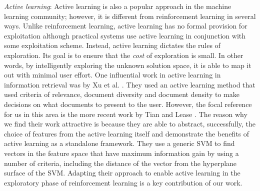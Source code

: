 \documentclass{acm_proc_article-sp}
\begin{document}
\emph{Active learning}: Active learning is also a popular approach in the machine learning community; however, it is different from reinforcement learning in several ways. Unlike reinforcement learning, active learning has no formal provision for exploitation although practical systems use active learning in conjunction with some exploitation scheme. Instead, active learning dictates the rules of exploration. Its goal is to ensure that the \emph{cost} of exploration is small. In other words, by intelligently exploring the unknown solution space, it is able to map it out with minimal user effort. One influential work in active learning in information retrieval was by Xu et al. \cite{active2}. They used an active learning method that used criteria of relevance, document diversity and document density to make decisions on what documents to present to the user. However, the focal reference for us in this area is the more recent work by Tian and Lease \cite{aibo}. The reason why we find their work attractive is because they are able to abstract, successfully, the choice of features from the active learning itself and demonstrate the benefits of active learning as a standalone framework. They use a generic SVM to find vectors in the feature space that have maximum information gain by using a number of criteria, including the distance of the vector from the hyperplane surface of the SVM. Adapting their approach to enable active learning in the exploratory phase of reinforcement learning is a key contribution of our work. 
\end{document}
